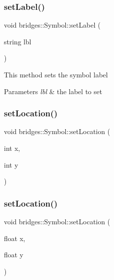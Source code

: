 \subsubsection{\texorpdfstring{set\+Label()}{setLabel()}}
{\footnotesize\ttfamily void bridges\+::\+Symbol\+::set\+Label (\begin{DoxyParamCaption}\item[{string}]{lbl }\end{DoxyParamCaption})\hspace{0.3cm}{\ttfamily [inline]}}

This method sets the symbol label


\begin{DoxyParams}{Parameters}
{\em lbl} & the label to set \\
\hline
\end{DoxyParams}
\mbox{\label{classbridges_1_1_symbol_a9a1bdebb8dcec2871243a269e618a351}} 
\subsubsection{\texorpdfstring{set\+Location()}{setLocation()}\hspace{0.1cm}{\footnotesize\ttfamily [1/2]}}
{\footnotesize\ttfamily void bridges\+::\+Symbol\+::set\+Location (\begin{DoxyParamCaption}\item[{int}]{x,  }\item[{int}]{y }\end{DoxyParamCaption})\hspace{0.3cm}{\ttfamily [inline]}}

\mbox{\label{classbridges_1_1_symbol_a5f774c3cbd407bc74d43e8d27bb6933f}} 
\subsubsection{\texorpdfstring{set\+Location()}{setLocation()}\hspace{0.1cm}{\footnotesize\ttfamily [2/2]}}
{\footnotesize\ttfamily void bridges\+::\+Symbol\+::set\+Location (\begin{DoxyParamCaption}\item[{float}]{x,  }\item[{float}]{y }\end{DoxyParamCaption})\hspace{0.3cm}{\ttfamily [inline]}}

